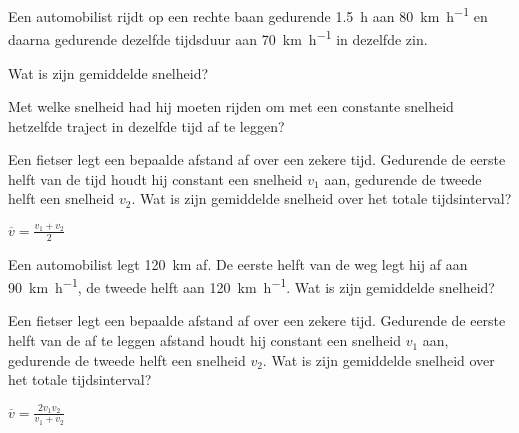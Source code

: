 \documentclass{ximera}
\begin{document}
	\author{Bart Lambregs}
    \xmsource\xmuitleg

\begin{exercise}
    Een automobilist rijdt op een rechte baan gedurende \SI{1,5}{\hour} aan \SI{80}{\kilo\meter\per\hour} en daarna gedurende dezelfde tijdsduur aan
    \SI{70}{\kilo\meter\per\hour} in dezelfde zin.
    \begin{question} Wat is zijn gemiddelde snelheid?                                                                                        \end{question}
    \begin{question} Met welke snelheid had hij moeten rijden om met een constante snelheid hetzelfde traject in dezelfde tijd af te leggen? \end{question}
\end{exercise}

\begin{exercise}
    Een fietser legt een bepaalde afstand af over een zekere tijd. Gedurende de eerste helft van de tijd houdt hij constant een snelheid $v_1$ aan, gedurende de tweede helft een snelheid $v_2$. Wat is zijn gemiddelde snelheid over het totale tijdsinterval?
    \begin{oplossing}
        $\overline{v}=\frac{v_1+v_2}{2}$
    \end{oplossing}
\end{exercise}

\begin{exercise}
    Een automobilist legt \SI{120}{km} af. De eerste helft van de weg legt hij af aan \SI{90}{\kilo\meter\per\hour}, de tweede helft aan \SI{120}{\kilo\meter\per\hour}. Wat is zijn gemiddelde snelheid?
\end{exercise}

\begin{exercise}
    Een fietser legt een bepaalde afstand af over een zekere tijd. Gedurende de eerste helft van de af te leggen afstand houdt hij constant een snelheid $v_1$ aan, gedurende de tweede helft een snelheid $v_2$. Wat is zijn gemiddelde snelheid over het totale tijdsinterval? 
\begin{oplossing}
    $\overline{v}=\frac{2v_1v_2}{v_1+v_2}$
\end{oplossing}
\end{exercise}
\end{document}
